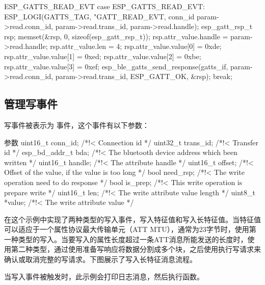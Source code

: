 \documentclass[lang=cn,newtx,10pt,scheme=chinese]{elegantbook}
\begin{document}
\begin{mycode}{ESP\_GATTS\_READ\_EVT}
case ESP_GATTS_READ_EVT: {
     ESP_LOGI(GATTS_TAG, "GATT_READ_EVT, conn_id %
              param->read.conn_id, param->read.trans_id, param->read.handle);  
              esp_gatt_rsp_t rsp;  
              memset(&rsp, 0, sizeof(esp_gatt_rsp_t));  
              rsp.attr_value.handle = param->read.handle;  
              rsp.attr_value.len = 4;  
              rsp.attr_value.value[0] = 0xde;  
              rsp.attr_value.value[1] = 0xed;  
              rsp.attr_value.value[2] = 0xbe;  
              rsp.attr_value.value[3] = 0xef;  
              esp_ble_gatts_send_response(gatts_if,  
                                          param->read.conn_id,  
                                          param->read.trans_id,  
                                          ESP_GATT_OK, &rsp);
     break;
    }
\end{mycode}

\subsection{管理写事件}

写事件被表示为  事件，这个事件有以下参数：

\begin{mycode}{参数}
uint16_t conn_id;         /*!< Connection id */
uint32_t trans_id;        /*!< Transfer id */
esp_bd_addr_t bda;        /*!< The bluetooth device address which been written */
uint16_t handle;          /*!< The attribute handle */
uint16_t offset;          /*!< Offset of the value, if the value is too long */
bool need_rsp;            /*!< The write operation need to do response */
bool is_prep;             /*!< This write operation is prepare write */
uint16_t len;             /*!< The write attribute value length */
uint8_t *value;           /*!< The write attribute value */
\end{mycode}

在这个示例中实现了两种类型的写入事件，写入特征值和写入长特征值。当特征值可以适应于一个属性协议最大传输单元（ATT MTU），通常为23字节时，使用第一种类型的写入。当要写入的属性长度超过一条ATT消息所能发送的长度时，使用第二种类型，通过使用准备写响应将数据分割成多个块，之后使用执行写请求来确认或取消完整的写请求。下图展示了写入长特征消息流程。

当写入事件被触发时，此示例会打印日志消息，然后执行函数。
\end{document}

